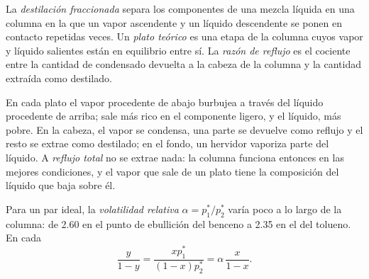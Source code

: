 \begin{definition}\label{def:b2:liquid-vapour-diagrams:fractional-distillation}
La \emph{destilación fraccionada} separa los
componentes de una mezcla líquida en una columna en la que un vapor ascendente y un
líquido descendente se ponen en contacto repetidas veces. Un \emph{plato
teórico} es una etapa de la columna cuyos vapor
y líquido salientes están en equilibrio entre sí. La \emph{razón de
reflujo} es el cociente entre la cantidad de condensado devuelta
a la cabeza de la columna y la cantidad extraída como destilado.
\end{definition}

En cada plato el vapor procedente de abajo burbujea a través del líquido procedente de arriba;
sale más rico en el componente ligero, y el líquido, más pobre. En la cabeza, el vapor
se condensa, una parte se devuelve como reflujo y el resto se extrae como
destilado; en el fondo, un hervidor vaporiza parte del líquido. A
\textit{reflujo total} no se extrae nada: la columna funciona entonces en las mejores condiciones,
y el vapor que sale de un plato tiene la composición del líquido que baja
sobre él.


Para un par ideal, la \textit{volatilidad relativa} $\alpha = p_1^*/p_2^*$
varía poco a lo largo de la columna: de 2.60 en el punto de ebullición del benceno a
2.35 en el del tolueno. En cada 
\[
  \frac{y}{1 - y} = \frac{xp_1^*}{(1 - x)p_2^*} = \alpha\,\frac{x}{1 - x} .
\]


